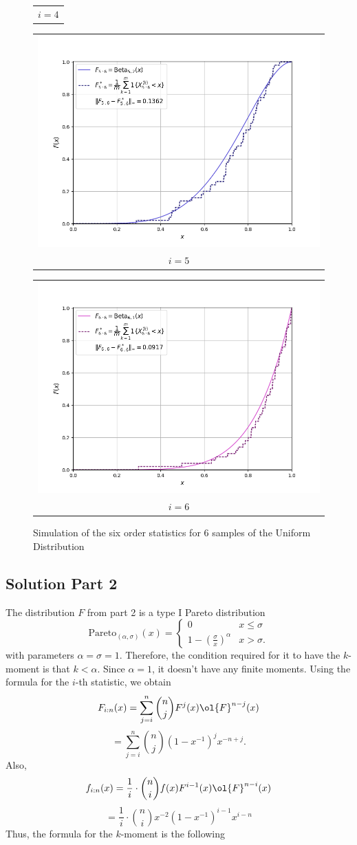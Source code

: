 \begin{figure}[H]
\begin{tabular}{@{}c@{}}
        $i = 4$
    \end{tabular}
    \begin{tabular}{@{}c@{}}
        \includegraphics[trim={1.1cm 0.5cm 1.5cm 0cm}, clip,width=.46\linewidth]{../simulation/unif_order_5:6.png} \\
        $i = 5$
      \end{tabular}
    \begin{tabular}{@{}c@{}}
        \includegraphics[trim={1.1cm 0.5cm 1.5cm 0cm}, clip,width=.46\linewidth]{../simulation/unif_order_6:6.png} \\
        $i = 6$
    \end{tabular}
    \caption{Simulation of the six order statistics for 6 samples of the Uniform Distribution}
\end{figure}

\newpage

\subsection*{Solution Part 2}

The distribution $F$ from part 2 is a type I Pareto distribution
\[ \text{Pareto}_{(\alpha, \sigma)}(x) = \begin{cases}
    0 & x\leq \sigma \\
    1- {\left( \frac{\sigma}{x} \right)}^{\alpha} & x > \sigma.
\end{cases} \]
with parameters $\alpha = \sigma = 1$. Therefore, the condition required for it to have the $k$-moment is that $k < \alpha$. Since $\alpha = 1$, it doesn't have any finite moments. Using the formula for the $i$-th statistic, we obtain
\[ F_{i:n}(x) = \sum_{j = i}^n \binom{n}{j} F^{j}(x)\ol{F}^{n-j}(x)\]
\[ = \sum_{j = i}^n \binom{n}{j} {(1-x^{-1})}^{j} x^{-n+j}. \]
Also,
\[ f_{i:n}(x) = \frac{1}{i}\cdot\binom{n}{i} f(x) F^{i-1}(x)\ol{F}^{n-i}(x) \]
\[ = \frac{1}{i}\cdot\binom{n}{i} x^{-2} {(1-x^{-1})}^{i-1}x^{i-n} \]
Thus, the formula for the $k$-moment is the following

